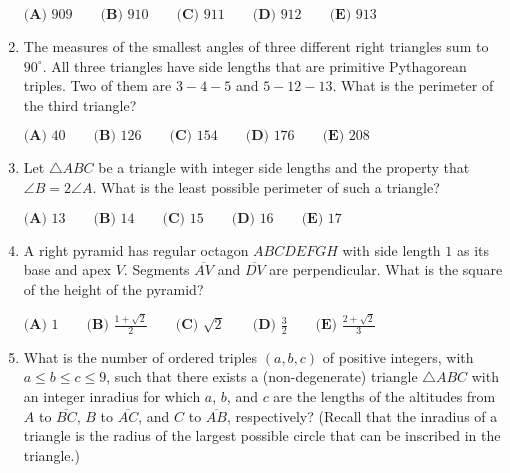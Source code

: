 \documentclass{article}
\begin{document}
\begin{enumerate}[label=\arabic*., itemsep=0.5em]
\(
\textbf{(A) }909\qquad
\textbf{(B) }910\qquad
\textbf{(C) }911\qquad
\textbf{(D) }912\qquad
\textbf{(E) }913\qquad
\)\par \vspace{0.5em}\item The measures of the smallest angles of three different right triangles sum to \(90^\circ\). All three triangles have side lengths that are primitive Pythagorean triples. Two of them are \(3-4-5\) and \(5-12-13\). What is the perimeter of the third triangle?

\(
\textbf{(A) }40 \qquad
\textbf{(B) }126 \qquad
\textbf{(C) }154 \qquad
\textbf{(D) }176 \qquad
\textbf{(E) }208 \qquad
\)\par \vspace{0.5em}\item Let \(\triangle{ABC}\) be a triangle with integer side lengths and the property that \(\angle{B} = 2\angle{A}\). What is the least possible perimeter of such a triangle?

\(
\textbf{(A) }13 \qquad
\textbf{(B) }14 \qquad
\textbf{(C) }15 \qquad
\textbf{(D) }16 \qquad
\textbf{(E) }17 \qquad
\)\par \vspace{0.5em}\item A right pyramid has regular octagon \(ABCDEFGH\) with side length \(1\) as its base and apex \(V.\) Segments \(\overline{AV}\) and \(\overline{DV}\) are perpendicular. What is the square of the height of the pyramid?

\(
\textbf{(A) }1 \qquad
\textbf{(B) }\frac{1+\sqrt2}{2} \qquad
\textbf{(C) }\sqrt2 \qquad
\textbf{(D) }\frac32 \qquad
\textbf{(E) }\frac{2+\sqrt2}{3} \qquad
\)\par \vspace{0.5em}\item What is the number of ordered triples \((a,b,c)\) of positive integers, with \(a\le b\le c\le 9\), such that there exists a (non-degenerate) triangle \(\triangle ABC\) with an integer inradius for which \(a\), \(b\), and \(c\) are the lengths of the altitudes from \(A\) to \(\overline{BC}\), \(B\) to \(\overline{AC}\), and \(C\) to \(\overline{AB}\), respectively? (Recall that the inradius of a triangle is the radius of the largest possible circle that can be inscribed in the triangle.)


\end{enumerate}
\end{document}

